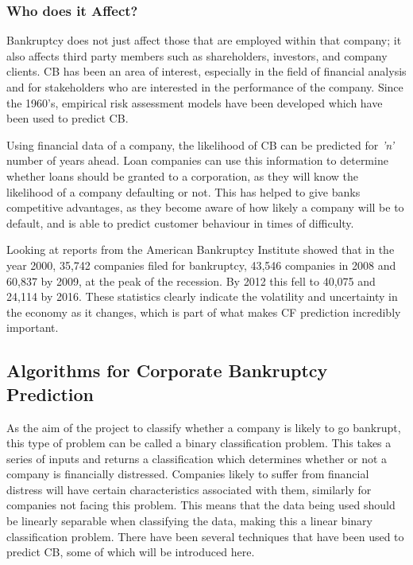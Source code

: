 \documentclass[11pt]{article}
\begin{document}
\subsubsection{Who does it Affect?}
Bankruptcy does not just affect those that are employed within that company; it also affects third party members such as shareholders, investors, and company clients. CB has been an area of interest, especially in the field of financial analysis and for stakeholders who are interested in the performance of the company\cite{?}. Since the 1960's, empirical risk assessment models have been developed which have been used to predict CB. 

Using financial data of a company, the likelihood of CB can be predicted for \textit{'n'} number of years ahead. 
Loan companies can use this information to determine whether loans should be granted to a corporation, as they will know the likelihood of a company defaulting or not\cite{?}. This has helped to give banks competitive advantages, as they become aware of how likely a company will be to default, and is able to predict customer behaviour in times of difficulty\cite{?}.

Looking at reports from the American Bankruptcy Institute showed that in the year 2000, 35,742 companies filed for bankruptcy, 43,546 companies in 2008 and 60,837 by 2009, at the peak of the recession. By 2012 this fell to 40,075 and 24,114 by 2016\cite{?}. These statistics clearly indicate the volatility and uncertainty in the economy as it changes, which is part of what makes CF prediction incredibly important.

\subsection{Algorithms for Corporate Bankruptcy Prediction}
As the aim of the project to classify whether a company is likely to go bankrupt, this type of problem can be called a binary classification problem. This takes a series of inputs and returns a classification which determines whether or not a company is financially distressed. Companies likely to suffer from financial distress will have certain characteristics associated with them, similarly for companies not facing this problem. This means that the data being used should be linearly separable when classifying the data, making this a linear binary classification problem. There have been several techniques that have been used to predict CB, some of which will be introduced here.  
\end{document}
